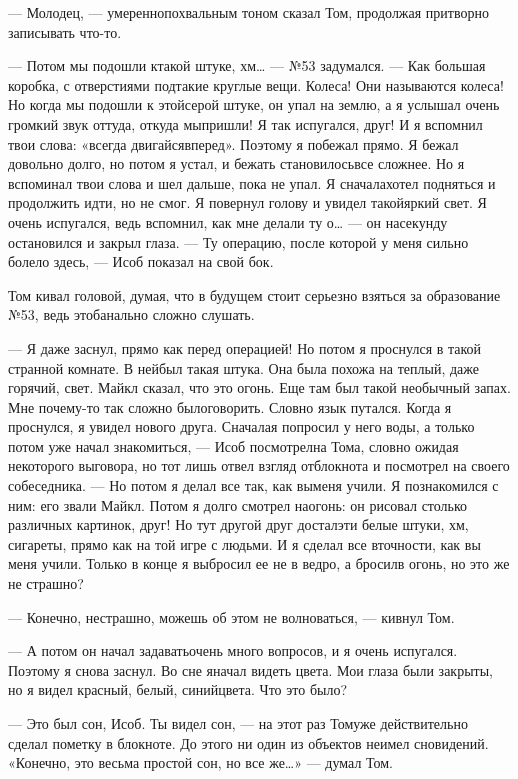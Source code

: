 — Молодец, — умереннопохвальным тоном сказал Том, продолжая притворно записывать что-то.

— Потом мы подошли ктакой штуке, хм… — №53 задумался. — Как большая коробка, с отверстиями подтакие круглые вещи. Колеса! Они называются колеса! Но когда мы подошли к этойсерой штуке, он упал на землю, а я услышал очень громкий звук оттуда, откуда мыпришли! Я так испугался, друг! И я вспомнил твои слова: «всегда двигайсявперед». Поэтому я побежал прямо. Я бежал довольно долго, но потом я устал, и бежать становилосьвсе сложнее. Но я вспоминал твои слова и шел дальше, пока не упал. Я сначалахотел подняться и продолжить идти, но не смог. Я повернул голову и увидел такойяркий свет. Я очень испугался, ведь вспомнил, как мне делали ту о… — он насекунду остановился и закрыл глаза. — Ту операцию, после которой у меня сильно болело здесь, — Исоб показал на свой бок.

Том кивал головой, думая, что в будущем стоит серьезно взяться за образование №53, ведь этобанально сложно слушать.

— Я даже заснул, прямо как перед операцией! Но потом я проснулся в такой странной комнате. В нейбыл такая штука. Она была похожа на теплый, даже горячий, свет. Майкл сказал, что это огонь. Еще там был такой необычный запах. Мне почему-то так сложно былоговорить. Словно язык путался. Когда я проснулся, я увидел нового друга. Сначалая попросил у него воды, а только потом уже начал знакомиться, — Исоб посмотрелна Тома, словно ожидая некоторого выговора, но тот лишь отвел взгляд отблокнота и посмотрел на своего собеседника. — Но потом я делал все так, как выменя учили. Я познакомился с ним: его звали Майкл. Потом я долго смотрел наогонь: он рисовал столько различных картинок, друг! Но тут другой друг досталэти белые штуки, хм, сигареты, прямо как на той игре с людьми. И я сделал все вточности, как вы меня учили. Только в конце я выбросил ее не в ведро, а бросилв огонь, но это же не страшно?

— Конечно, нестрашно, можешь об этом не волноваться, — кивнул Том.

— А потом он начал задаватьочень много вопросов, и я очень испугался. Поэтому я снова заснул. Во сне яначал видеть цвета. Мои глаза были закрыты, но я видел красный, белый, синийцвета. Что это было?

— Это был сон, Исоб. Ты видел сон, — на этот раз Томуже действительно сделал пометку в блокноте. До этого ни один из объектов неимел сновидений. «Конечно, это весьма простой сон, но все же…» — думал Том.

